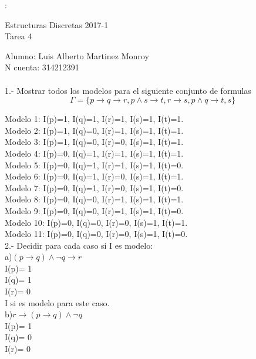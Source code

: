 \documentclass[paper=letter, fontsize=12pt]{scrartcl}
\begin{document}
\parindent=0mm:
	\begin{center}
  Estructuras Discretas 2017-1\\
  Tarea 4\\
\end{center}

Alumno: Luis Alberto Martinez Monroy\\
N cuenta: 314212391\\ \\

1.- Mostrar todos los modelos para el siguiente conjunto de formulas\\
$$
\Gamma = \{p \rightarrow q \rightarrow r, p\wedge s \rightarrow t, r\rightarrow s, p\wedge q \rightarrow t, s\}
$$


Modelo 1: I(p)=1, I(q)=1, I(r)=1, I(s)=1, I(t)=1.\\
Modelo 2: I(p)=1, I(q)=0, I(r)=1, I(s)=1, I(t)=1.\\
Modelo 3: I(p)=1, I(q)=0, I(r)=0, I(s)=1, I(t)=1.\\
Modelo 4: I(p)=0, I(q)=1, I(r)=1, I(s)=1, I(t)=1.\\
Modelo 5: I(p)=0, I(q)=1, I(r)=1, I(s)=1, I(t)=0.\\
Modelo 6: I(p)=0, I(q)=1, I(r)=0, I(s)=1, I(t)=1.\\
Modelo 7: I(p)=0, I(q)=1, I(r)=0, I(s)=1, I(t)=0.\\
Modelo 8: I(p)=0, I(q)=0, I(r)=1, I(s)=1, I(t)=1.\\
Modelo 9: I(p)=0, I(q)=0, I(r)=1, I(s)=1, I(t)=0.\\
Modelo 10: I(p)=0, I(q)=0, I(r)=0, I(s)=1, I(t)=1.\\
Modelo 11: I(p)=0, I(q)=0, I(r)=0, I(s)=1, I(t)=0.\\


2.- Decidir para cada caso si I es modelo:\\

a)$ (p\rightarrow q) \wedge \neg q \rightarrow r$\\

I(p)= 1\\
I(q)= 1\\
I(r)= 0\\

I si es modelo para este caso.\\

b)$ r \rightarrow (p\rightarrow q)\wedge \neg q$\\

I(p)= 1\\
I(q)= 0\\
I(r)= 0\\
\end{document}
